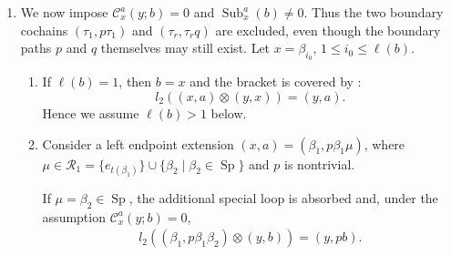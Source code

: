 \documentclass[11pt,a4paper,reqno]{amsart}
\newcommand{\mC}{\mathcal C}
\newcommand{\mR}{\mathcal R}
\newcommand{\Sub}{\operatorname{Sub}}
\newcommand{\Sp}{\operatorname{Sp}}
\newcommand{\para}[2]{(#1,#2)}
\newcommand{\bi}{\beta_{i_0}}
\theoremstyle{plain}
\theoremstyle{definition}
\numberwithin{equation}{section}
\begin{document}
\begin{enumerate}
\begin{enumerate}
			\item Let $\para{x}{a}=\para{\tau_1}{p\tau_1}$, and suppose that $p$
			passes through $t(\tau_r)$.  Write $p=\eta \zeta$ as in
			\[
			\begin{tikzcd}
				\bullet && \bullet \\
				\\
				\bullet && \bullet
				\arrow["{\tau_1}", from=1-1, to=1-3]
				\arrow["\rho"', curve={height=12pt}, dotted, from=1-1, to=3-1]
				\arrow["\eta", curve={height=-18pt}, dotted, from=1-1, to=3-1]
				\arrow[dotted, from=1-3, to=3-3]
				\arrow[dotted, from=3-1, to=1-1]
				\arrow["\zeta", curve={height=-30pt}, dotted, from=3-1, to=1-1]
				\arrow["{\tau_r}", from=3-3, to=3-1]
			\end{tikzcd}
			\]
			Here $\rho$ begins with $\tau_1$, while $\eta$ does not contain
			$\tau_1$, and $b\in\{\rho,\eta,p\rho\}$.  The only additional
			value path is $b=\eta$, for which
			\[
			l_2(\para{\tau_1}{p\tau_1}\otimes\para{y}{\eta})
			=-\para{y}{p\eta}.
			\]
			Condition \textup{(G4)} forces the junction $\zeta\eta$ in
			$p\eta=\eta\zeta\eta$ to belong to $I^S$. Hence
			$p\eta=0$, and this bracket vanishes.
			
			\item The case
			$\para{x}{a}=\para{\tau_r}{\tau_rq}$ is excluded by the left-right
			symmetric argument and produces no further nonzero bracket.
		\end{enumerate}
		
		\item We now impose
		$\mC_x^a(y;b)=0$
		and
		$\Sub_x^a(b)\neq0$.
		Thus the two boundary cochains
		$\para{\tau_1}{p\tau_1}$ and $\para{\tau_r}{\tau_rq}$ are excluded, even
		though the boundary paths $p$ and $q$ themselves may still exist.  Let
		$x=\bi$, $1\le i_0\le\ell(b)$.
		
		\begin{enumerate}
			\item If $\ell(b)=1$, then $b=x$ and the bracket is covered by
			:
			\[
			l_2(\para{x}{a}\otimes\para{y}{x})=\para{y}{a}.
			\]
			Hence we assume $\ell(b)>1$ below.
			
			\item Consider a left endpoint extension
			$\para{x}{a}=\para{\beta_1}{p\beta_1\mu}$, where
			$\mu\in\mR_1=\{e_{t(\beta_1)}\}\cup
			\{\beta_2 \mid \beta_2\in\Sp\}$ and $p$ is nontrivial.
			
			If $\mu=\beta_2\in\Sp$, the additional special loop is absorbed and,
			under the assumption $\mC_x^a(y;b)=0$,
			\begin{align}
				l_2(\para{\beta_1}{p\beta_1\beta_2}\otimes\para{y}{b})
				=\para{y}{pb}.
			\end{align}
			

\end{enumerate}
\end{enumerate}
\end{document}
